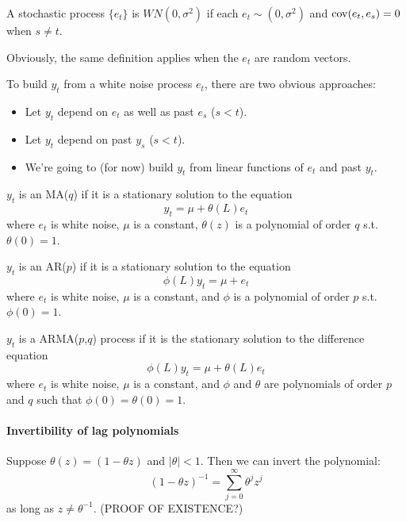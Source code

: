 \begin{defn}
  A stochastic process $\{e_t\}$ is $WN(0, \sigma^2)$ if each
  $e_t ∼ (0, \sigma^2)$ and $\operatorname{cov}(e_t, e_s) = 0$ when $s \neq t$.
\end{defn}

Obviously, the same definition applies when the $e_t$ are random
vectors.

To build $y_t$ from a white noise process $e_t$, there are two obvious
approaches:
\begin{itemize}
\item Let $y_t$ depend on $e_t$ as well as past $e_s$ ($s < t$).
\item Let $y_t$ depend on past $y_s$ ($s < t$).
\item We're going to (for now) build $y_t$ from linear functions of
  $e_t$ and past $y_t$.
\end{itemize}

\begin{defn}
  $y_t$ is an MA($q$) if it is a stationary solution to the equation
  \begin{equation*}
    y_t = \mu + \theta(L) e_t
  \end{equation*}
  where $e_t$ is white noise, $\mu$ is a constant, $\theta(z)$ is a
  polynomial of order $q$ s.t. $\theta(0) = 1$.
\end{defn}

\begin{defn}
  $y_t$ is an AR($p$) if it is a stationary solution to the
  equation
  \begin{equation*}
    \phi(L) y_t = \mu + e_t
  \end{equation*}
  where $e_t$ is white noise, $\mu$ is a constant, and $\phi$ is a
  polynomial of order $p$ s.t. $\phi(0) = 1$.
\end{defn}

\begin{defn}
  $y_t$ is a ARMA($p$,$q$) process if it is the
  stationary solution to the difference equation
  \begin{equation*}
    \phi(L) y_t = \mu + \theta(L) e_t
  \end{equation*}
  where $e_t$ is white noise, $\mu$ is a constant, and $\phi$ and
  $\theta$ are polynomials of order $p$ and $q$ such that $\phi(0) =
  \theta(0) = 1$.
\end{defn}

\paragraph{Invertibility of lag polynomials} Suppose $\theta(z) = (1 -
\theta z)$ and $|\theta| < 1$. Then we can invert the polynomial:
\begin{equation*}
  (1 - \theta z)^{-1} = \sum_{j=0}^\infty \theta^j z^j
\end{equation*}
as long as $z \neq \theta^{-1}$. (PROOF OF EXISTENCE?)

